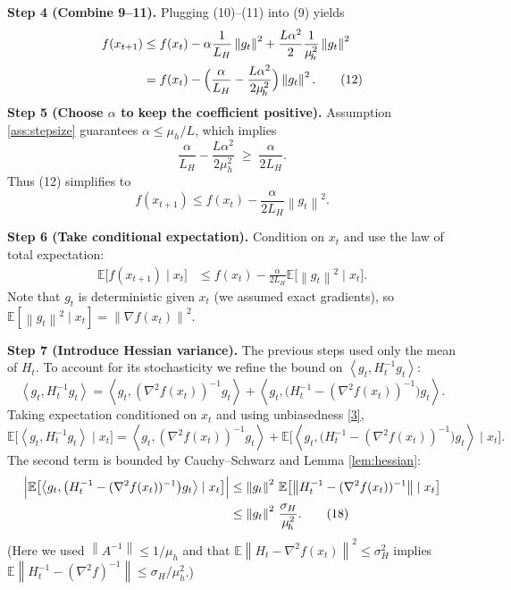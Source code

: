 \documentclass{article}
\newcommand{\E}{\mathbb{E}}
\newcommand{\norm}[1]{\left\|#1\right\|}
\newcommand{\inner}[1]{\left\langle #1 \right\rangle}
\begin{document}
\noindent\textbf{Step 4 (Combine 9–11).}  
Plugging (10)–(11) into (9) yields
\begin{align}
f(x_{t+1})
&\le f(x_t)
   -\alpha\frac{1}{L_{H}}\norm{g_t}^{2}
   +\frac{L\alpha^{2}}{2}\frac{1}{\mu_{\!h}^{2}}\norm{g_t}^{2} \nonumber\\
&= f(x_t)-\Bigl(\frac{\alpha}{L_{H}}-\frac{L\alpha^{2}}{2\mu_{\!h}^{2}}\Bigr)\norm{g_t}^{2}. \tag{12}
\end{align}
\noindent\textbf{Step 5 (Choose $\alpha$ to keep the coefficient positive).}  
Assumption \ref{ass:stepsize} guarantees $\alpha\le \mu_{\!h}/L$, which implies
\[
\frac{\alpha}{L_{H}}-\frac{L\alpha^{2}}{2\mu_{\!h}^{2}}
\;\ge\;
\frac{\alpha}{2L_{H}}. \tag{13}
\]
Thus (12) simplifies to
\[
f(x_{t+1})\le f(x_t)-\frac{\alpha}{2L_{H}}\norm{g_t}^{2}. \tag{14}
\]

\noindent\textbf{Step 6 (Take conditional expectation).}  
Condition on $x_t$ and use the law of total expectation:
\begin{align}
\E\!\bigl[f(x_{t+1})\mid x_t\bigr]
&\le f(x_t)-\frac{\alpha}{2L_{H}}\E\!\bigl[\norm{g_t}^{2}\mid x_t\bigl].
\tag{15}
\end{align}
Note that $g_t$ is deterministic given $x_t$ (we assumed exact gradients), so $\E[\norm{g_t}^{2}\mid x_t]=\norm{\nabla f(x_t)}^{2}$.

\noindent\textbf{Step 7 (Introduce Hessian variance).}  
The previous steps used only the mean of $H_t$.  To account for its stochasticity we refine the bound on $\inner{g_t, H_t^{-1}g_t}$:
\[
\inner{g_t, H_t^{-1}g_t}
= \inner{g_t, (\nabla^{2}f(x_t))^{-1}g_t}
   +\inner{g_t,\bigl(H_t^{-1}-(\nabla^{2}f(x_t))^{-1}\bigr)g_t}.
\tag{16}
\]
Taking expectation conditioned on $x_t$ and using unbiasedness \eqref{3},
\[
\E\bigl[\inner{g_t, H_t^{-1}g_t}\mid x_t\bigr]
= \inner{g_t, (\nabla^{2}f(x_t))^{-1}g_t}
  +\E\bigl[\inner{g_t,\bigl(H_t^{-1}-(\nabla^{2}f(x_t))^{-1}\bigr)g_t}\mid x_t\bigr].
\tag{17}
\]
The second term is bounded by Cauchy–Schwarz and Lemma \ref{lem:hessian}:
\begin{align}
\Bigl|\E\bigl[\inner{g_t,\bigl(H_t^{-1}-(\nabla^{2}f(x_t))^{-1}\bigr)g_t}\mid x_t\bigr]\Bigr|
&\le \norm{g_t}^{2}\,
   \E\bigl[\norm{H_t^{-1}-(\nabla^{2}f(x_t))^{-1}}\mid x_t\bigr] \nonumber\\
&\le \norm{g_t}^{2}\,
   \frac{\sigma_{H}}{\mu_{\!h}^{2}}. \tag{18}
\end{align}
(Here we used $\norm{A^{-1}}\le 1/\mu_{\!h}$ and that $\E\norm{H_t-\nabla^{2}f(x_t)}^{2}\le\sigma_H^{2}$ implies $\E\norm{H_t^{-1}-(\nabla^{2}f)^{-1}}\le\sigma_H/\mu_{\!h}^{2}$.)
\end{document}
